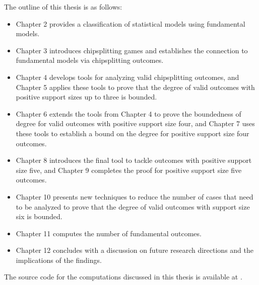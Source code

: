 The outline of this thesis is as follows: 
\begin{itemize}
    \item Chapter 2 provides a classification of statistical models using fundamental models.
    \item Chapter 3 introduces chipsplitting games and establishes the connection to fundamental models via chipsplitting outcomes.
    \item Chapter 4 develops tools for analyzing valid chipsplitting outcomes, and Chapter 5 applies these tools to prove that the degree of valid outcomes with positive support sizes up to three is bounded.
    \item Chapter 6 extends the tools from Chapter 4 to prove the boundedness of degree for valid outcomes with positive support size four, and Chapter 7 uses these tools to establish a bound on the degree for positive support size four outcomes.
    \item Chapter 8 introduces the final tool to tackle outcomes with positive support size five, and Chapter 9 completes the proof for positive support size five outcomes.
    \item Chapter 10 presents new techniques to reduce the number of cases that need to be analyzed to prove that the degree of valid outcomes with support size six is bounded.
    \item Chapter 11 computes the number of fundamental outcomes.
    \item Chapter 12 concludes with a discussion on future research directions and the implications of the findings.
\end{itemize}


The source code for the computations discussed in this thesis is available at \cite{ducrepo}.
